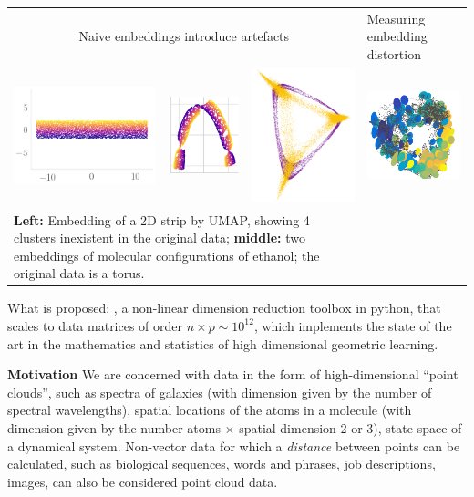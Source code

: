 \documentclass[floatfix,11pt]{revtex4}
\begin{document}
\begin{tabular}{llll}
\multicolumn{3}{c}{Naive embeddings introduce artefacts}
&
Measuring embedding distortion
\\
\includegraphics[width=1.7in]{Figures/D1_original_data.png} &
\includegraphics[width=0.8in]{Figures/umap_mindist_comp.png} &
\includegraphics[width=1.2in,angle=90]{Figures/geometric_vs_normalized.png}
&
\includegraphics[width=1.2in]{Figures/aspirin-postclu1-phi234Rmetric-tau22.png}
\\
\multicolumn{3}{l}{\parbox{4.7in}{{\bf Left:} Embedding of a 2D strip by UMAP, showing 4 clusters inexistent in the original data; {\bf middle:} two embeddings of molecular configurations of ethanol; the original data is a torus.}}\\
\end{tabular}

What is proposed: \gmani, a non-linear dimension reduction toolbox
in python, that scales to data matrices of order $n\times p \sim
10^{12}$, which implements the state of the art in the mathematics and
statistics of high dimensional geometric learning.

\textbf{Motivation} We are concerned with data in the form of
high-dimensional ``point clouds'', such as spectra of galaxies (with
dimension given by the number of spectral wavelengths), spatial
locations of the atoms in a molecule (with dimension given by the number atoms $\times$ spatial dimension 2 or 3), state space of a dynamical system. Non-vector data for which a {\em distance} between points can
be calculated, such as biological sequences, words and phrases, job
descriptions, images, can also be considered point cloud data. 
\end{document}
